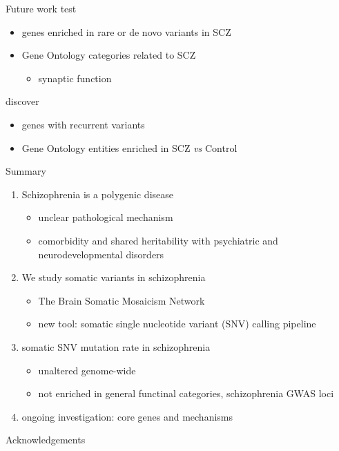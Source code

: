 \documentclass[usenames,dvipsnames]{beamer}
\begin{document}
\begin{frame}{Future work}
test
\begin{itemize}
\item genes enriched in rare or de novo variants in SCZ
\item Gene Ontology categories related to SCZ
\begin{itemize}
\item synaptic function
\end{itemize}
\end{itemize}

\vfill
discover
\begin{itemize}
\item genes with recurrent variants
\item Gene Ontology entities enriched in SCZ \textit{vs} Control
\end{itemize}
\end{frame}

\begin{frame}{Summary}
\begin{enumerate}
\item Schizophrenia is a polygenic disease
	\begin{itemize}
                \item unclear pathological mechanism
		\item comorbidity and shared heritability with psychiatric and
			neurodevelopmental disorders
	\end{itemize}
\item We study somatic variants in schizophrenia
	\begin{itemize}
		\item The Brain Somatic Mosaicism Network 
		\item new tool: somatic single nucleotide variant (SNV) calling pipeline
	\end{itemize}
\item somatic SNV mutation rate in schizophrenia
	\begin{itemize}
		\item unaltered genome-wide
		\item not enriched in general functinal categories,
			schizophrenia GWAS loci
	\end{itemize}
\item ongoing investigation: core genes and mechanisms
\end{enumerate}
\end{frame}

\begin{frame}{Acknowledgements}

\end{frame}
\end{document}
